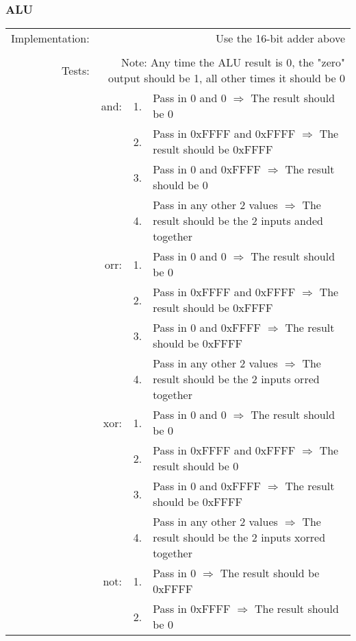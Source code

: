 		\subsubsection{ALU}
			\begin{longtable}{ r r r p{11cm} }
				Implementation: & \multicolumn{3}{p{12.75cm}}{Use the 16-bit adder above}\\
				                &      &    & \\
				         Tests: & \multicolumn{3}{p{12.75cm}}{Note:  Any time the ALU result is 0, the "zero" output should be 1, all other times it should be 0}\\
				                & and: & 1. & Pass in 0 and 0 $\Rightarrow$ The result should be 0\\
				                &      & 2. & Pass in 0xFFFF and 0xFFFF $\Rightarrow$ The result should be 0xFFFF\\
				                &      & 3. & Pass in 0 and 0xFFFF $\Rightarrow$ The result should be 0\\
				                &      & 4. & Pass in any other 2 values $\Rightarrow$ The result should be the 2 inputs anded together\\
				                & orr: & 1. & Pass in 0 and 0 $\Rightarrow$ The result should be 0\\
				                &      & 2. & Pass in 0xFFFF and 0xFFFF $\Rightarrow$ The result should be 0xFFFF\\
				                &      & 3. & Pass in 0 and 0xFFFF $\Rightarrow$ The result should be 0xFFFF\\
				                &      & 4. & Pass in any other 2 values $\Rightarrow$ The result should be the 2 inputs orred together\\
				                & xor: & 1. & Pass in 0 and 0 $\Rightarrow$ The result should be 0\\
				                &      & 2. & Pass in 0xFFFF and 0xFFFF $\Rightarrow$ The result should be 0\\
				                &      & 3. & Pass in 0 and 0xFFFF $\Rightarrow$ The result should be 0xFFFF\\
				                &      & 4. & Pass in any other 2 values $\Rightarrow$ The result should be the 2 inputs xorred together\\
				                & not: & 1. & Pass in 0 $\Rightarrow$ The result should be 0xFFFF\\
				                &      & 2. & Pass in 0xFFFF $\Rightarrow$ The result should be 0\\

\end{longtable}

